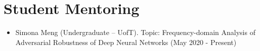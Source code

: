 \section*{Student Mentoring}
\vspace{\postsubhead}
\begin{adjustwidth}{\indentleft}{\indentright}
  \begin{itemize}
    
    \item Simona Meng (Undergraduate – UofT). Topic: Frequency-domain Analysis of Adversarial Robustness of Deep Neural Networks (May 2020 - Present) 
    
  \end{itemize}
\end{adjustwidth}
